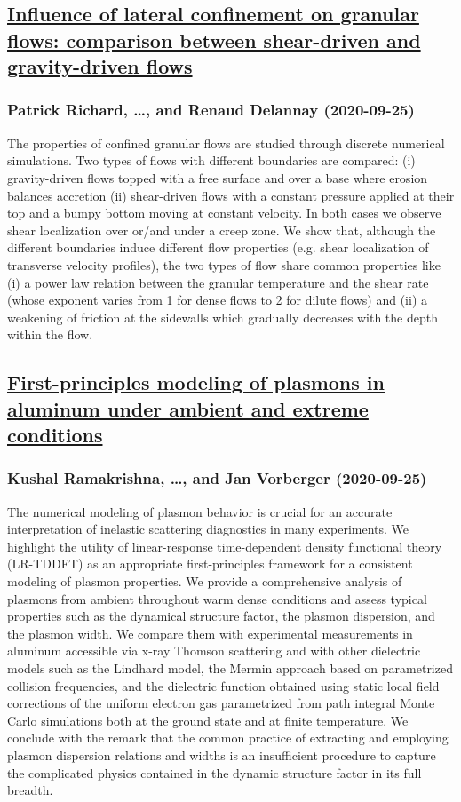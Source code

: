 \subsection*{\href{http://arxiv.org/abs/2009.12182v1}{Influence of lateral confinement on granular flows: comparison between  shear-driven and gravity-driven flows}}
\subsubsection*{Patrick Richard, \dots, and Renaud Delannay (2020-09-25)}
The properties of confined granular flows are studied through discrete
numerical simulations. Two types of flows with different boundaries are
compared: (i) gravity-driven flows topped with a free surface and over a base
where erosion balances accretion (ii) shear-driven flows with a constant
pressure applied at their top and a bumpy bottom moving at constant velocity.
In both cases we observe shear localization over or/and under a creep zone. We
show that, although the different boundaries induce different flow properties
(e.g. shear localization of transverse velocity profiles), the two types of
flow share common properties like (i) a power law relation between the granular
temperature and the shear rate (whose exponent varies from 1 for dense flows to
2 for dilute flows) and (ii) a weakening of friction at the sidewalls which
gradually decreases with the depth within the flow.

\subsection*{\href{http://arxiv.org/abs/2009.12163v1}{First-principles modeling of plasmons in aluminum under ambient and  extreme conditions}}
\subsubsection*{Kushal Ramakrishna, \dots, and Jan Vorberger (2020-09-25)}
The numerical modeling of plasmon behavior is crucial for an accurate
interpretation of inelastic scattering diagnostics in many experiments. We
highlight the utility of linear-response time-dependent density functional
theory (LR-TDDFT) as an appropriate first-principles framework for a consistent
modeling of plasmon properties. We provide a comprehensive analysis of plasmons
from ambient throughout warm dense conditions and assess typical properties
such as the dynamical structure factor, the plasmon dispersion, and the plasmon
width. We compare them with experimental measurements in aluminum accessible
via x-ray Thomson scattering and with other dielectric models such as the
Lindhard model, the Mermin approach based on parametrized collision
frequencies, and the dielectric function obtained using static local field
corrections of the uniform electron gas parametrized from path integral Monte
Carlo simulations both at the ground state and at finite temperature. We
conclude with the remark that the common practice of extracting and employing
plasmon dispersion relations and widths is an insufficient procedure to capture
the complicated physics contained in the dynamic structure factor in its full
breadth.

